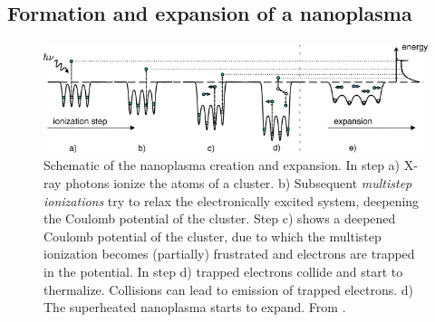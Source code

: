 \subsection{Formation and expansion of a nanoplasma}\label{sec:nanoplasma-expansion}
\begin{figure}
	\centering
		\includegraphics[width=1.00\textwidth]{images/nano-plasma-schematic.jpg}
	\caption[Schematic of the nanoplasma creation and expansion.]{Schematic of the nanoplasma creation and expansion. In step a) X-ray photons ionize the atoms of a cluster. b) Subsequent \textit{multistep ionizations} try to relax the electronically excited system, deepening the Coulomb potential of the cluster. Step c) shows a deepened Coulomb potential of the cluster, due to which the multistep ionization becomes (partially) frustrated and electrons are trapped in the potential. In step d) trapped electrons collide and start to thermalize. Collisions can lead to emission of trapped electrons. d) The superheated nanoplasma starts to expand. From \citep[\href{https://creativecommons.org/licenses/by/3.0/}{\ccby}]{Arbeiter-2011-NJP}.}
	\label{fig:nano-plasma-schematic}
\end{figure}
